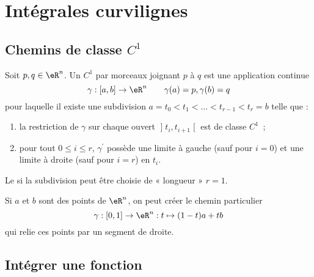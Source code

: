 \section{Intégrales curvilignes}
\label{secintcurvi}

\subsection{Chemins de classe \texorpdfstring{$C^1$}{C1}}

\begin{definition}
    Soit $p, q\in \eR^n$. Un  $C^1$ par morceaux joignant $p$ à $q$ est une application continue
    \begin{equation}
      \gamma : [a,b] \to \eR^n \qquad \gamma(a) = p, \gamma(b) = q
    \end{equation}
    pour laquelle il existe une subdivision $a = t_0 < t_1 < \ldots < t_{r-1} < t_r = b$ telle que :
    \begin{enumerate}
    \item la restriction de $\gamma$ sur chaque ouvert $\mathopen]t_i, t_{i+1}\mathclose[$ est de classe $C^1$~;
    \item pour tout $0 \leq i \leq r$, $\gamma^\prime$ possède une limite à gauche (sauf pour $i = 0$) et une limite à droite (sauf pour $i = r$) en $t_i$.
    \end{enumerate}
    Le  si la subdivision peut être choisie de « longueur » $r = 1$.
\end{definition}

\begin{remark}
	Si $a$ et $b$ sont des points de $\eR^n$, on peut créer le chemin particulier
  \begin{equation}
    \gamma : [0,1] \to \eR^n : t \mapsto (1-t)a + tb
  \end{equation}
  qui relie ces points par un segment de droite.
\end{remark}

\subsection{Intégrer une fonction}

